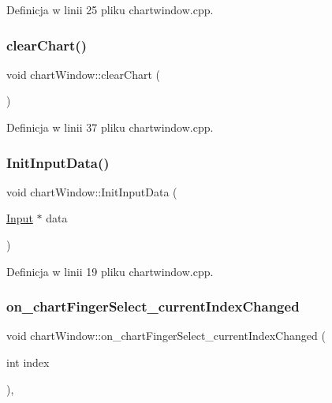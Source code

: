 Definicja w linii 25 pliku chartwindow.\+cpp.

\mbox{\label{classchart_window_a654c2fa3ffd7ddf0465b150e2d070355}} 
\subsubsection{\texorpdfstring{clear\+Chart()}{clearChart()}}
{\footnotesize\ttfamily void chart\+Window\+::clear\+Chart (\begin{DoxyParamCaption}{ }\end{DoxyParamCaption})}



Definicja w linii 37 pliku chartwindow.\+cpp.

\mbox{\label{classchart_window_ab574e80c2d8edcc06f6d0f0d7e843168}} 
\subsubsection{\texorpdfstring{Init\+Input\+Data()}{InitInputData()}}
{\footnotesize\ttfamily void chart\+Window\+::\+Init\+Input\+Data (\begin{DoxyParamCaption}\item[{\hyperlink{class_input}{Input} $\ast$}]{data }\end{DoxyParamCaption})}



Definicja w linii 19 pliku chartwindow.\+cpp.

\mbox{\label{classchart_window_a2d9399679ac24942f51e498e39058689}} 
\subsubsection{\texorpdfstring{on\+\_\+chart\+Finger\+Select\+\_\+current\+Index\+Changed}{on\_chartFingerSelect\_currentIndexChanged}}
{\footnotesize\ttfamily void chart\+Window\+::on\+\_\+chart\+Finger\+Select\+\_\+current\+Index\+Changed (\begin{DoxyParamCaption}\item[{int}]{index }\end{DoxyParamCaption})\hspace{0.3cm}{\ttfamily [private]}, {\ttfamily [slot]}}



